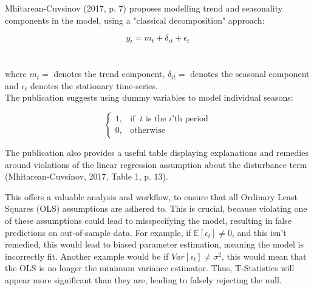 \documentclass[11pt, a4paper]{article}
\begin{document}
Mhitarean-Cuvsinov (2017, p. 7) proposes modelling trend and seasonality components in the model, using a "classical decomposition" approach:

\begin{equation}
y_{t}=m_{t} + \delta_{it} + \epsilon_{t}
\end{equation}
\\\\
where $m_{t}=$ denotes the trend component, $\delta_{it}=$ denotes the seasonal component and $\epsilon_{t}$ denotes the stationary time-series.\\

The publication suggests using dummy variables to model individual seasons:

\begin{equation}
    \begin{cases}
      1, & \text{if}\;\;t\text{ is the }i\text{'th period} \\
      0, & \text{otherwise}
    \end{cases}
\end{equation}

The publication also provides a useful table displaying explanations and remedies around violations of the linear regression assumption about the disturbance term (Mhitarean-Cuvsinov, 2017, Table 1, p. 13).

This offers a valuable analysis and workflow, to ensure that all Ordinary Least Squares (OLS) assumptions are adhered to. This is crucial, because violating one of these assumptions could lead to misspecifying the model, resulting in false predictions on out-of-sample data. For example, if $\mathbb{E}[\epsilon_{t}] \not= 0$, and this isn’t remedied, this would lead to biased parameter estimation, meaning the model is incorrectly fit. Another example would be if $Var[\epsilon_{t}] \not= \sigma^2$, this would mean that the OLS is no longer the minimum variance estimator. Thus, T-Statistics will appear more significant than they are, leading to falsely rejecting the null. 
\end{document}

